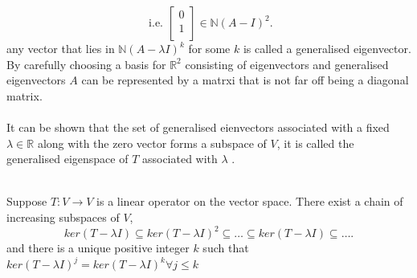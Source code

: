 \documentclass{report}
\begin{document}
\[
	 \text{ i.e. } \begin{bmatrix}
	 0\\
	 1\\
	 \end{bmatrix}
	  \in \mathbb{N} \left( A - I   \right)        ^2
.\] 
any vector that lies in $  \mathbb{N} \left(  A - \lambda I   \right) ^{k} $  for some $ k$ is called a generalised eigenvector. By carefully choosing a basis for $ \mathbb{R} ^2$ consisting of eigenvectors and generalised eigenvectors $ A$ can be represented by a matrxi that is not far off being a diagonal matrix.\\
\\
   It can be shown that the set of generalised eienvectors associated with a fixed $ \lambda \in \mathbb{R} $ along with the zero vector forms a subspace of $ V$, it is called the generalised eigenspace of $ T $ associated with $ \lambda$ .
   \\
   \\
   \thm{}
   {
   Suppose $ T: V \to V$ is a linear operator on the vector space. There exist a chain of increasing subspaces of $ V$,
   \[
	   ker \left( T- \lambda I  \right)  \subseteq ker \left( T- \lambda I  \right)^2  \subseteq \ldots \subseteq ker \left( T- \lambda I  \right)  \subseteq \ldots
   .\] 
   and there is a unique positive integer $ k$ such that $ ker \left( T -  \lambda I \right) ^{j} = ker \left( T - \lambda I  \right) ^{k} \forall  j \le k $

   }
\end{document}
